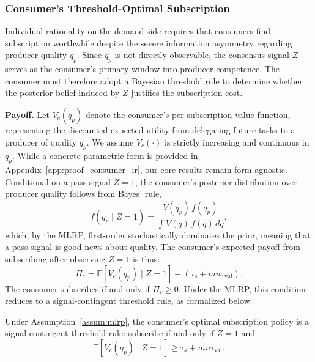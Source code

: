 \subsubsection{Consumer's Threshold-Optimal Subscription}
\label{sec:consumer_ir}

Individual rationality on the demand side requires that consumers find subscription worthwhile despite the severe information asymmetry regarding producer quality $q_p$. Since $q_p$ is not directly observable, the consensus signal $Z$ serves as the consumer's primary window into producer competence. The consumer must therefore adopt a Bayesian threshold rule to determine whether the posterior belief induced by $Z$ justifies the subscription cost.

\textbf{Payoff.} Let $V_c(q_p)$ denote the consumer's per-subscription value function, representing the discounted expected utility from delegating future tasks to a producer of quality $q_p$. We assume $V_c(\cdot)$ is strictly increasing and continuous in $q_p$. While a concrete parametric form is provided in Appendix~\ref{app:proof_consumer_ir}, our core results remain form-agnostic. Conditional on a pass signal $Z = 1$, the consumer's posterior distribution over producer quality follows from Bayes' rule,
\begin{equation}
\label{eq:posterior}
f(q_p \mid Z = 1) = \frac{V(q_p)\,f(q_p)}{\int V(q)\,f(q)\,dq},
\end{equation}
which, by the MLRP, first-order stochastically dominates the prior, meaning that a pass signal is good news about quality. The consumer's expected payoff from subscribing after observing $Z = 1$ is thus:
\begin{equation}
\label{eq:consumer_payoff}
\Pi_c = \mathbb{E}[V_c(q_p) \mid Z = 1] - (\tau_s + mn\tau_{\text{val}}).
\end{equation}
The consumer subscribes if and only if $\Pi_c \geq 0$. Under the MLRP, this condition reduces to a signal-contingent threshold rule, as formalized below.

\begin{theorem}[Consumer IR]
\label{IR-based Policy for Consumers}
Under Assumption~\ref{assum:mlrp}, the consumer's optimal subscription policy is a signal-contingent threshold rule: subscribe if and only if $Z = 1$ and
\begin{equation}
\label{eq:consumer_threshold}
\mathbb{E}[V_c(q_p) \mid Z = 1] \geq \tau_s + mn\tau_{\text{val}}.
\end{equation}
\end{theorem}

